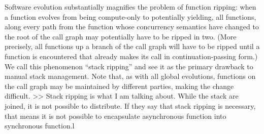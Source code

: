 Software evolution substantially magnifies the problem of function ripping: when a function evolves from being compute-only to potentially yielding, all functions, along every path from the function whose concurrency semantics have changed to the root of the call graph may potentially have to be ripped in two. (More precisely, all functions up a branch of the call graph will have to be ripped until a function is encountered that already makes its call in continuation-passing form.) We call this phenomenon ``stack ripping'' and see it as the primary drawback to manual stack management. Note that, as with all global evolutions, functions on the call graph may be maintained by different parties, making the change difficult. 
>> Stack ripping is what I am talking about.
   While the stack are joined, it is not possible to distribute.
   If they say that stack ripping is necessary, that means it is not possible to encapsulate asynchronous function into synchronous function.l